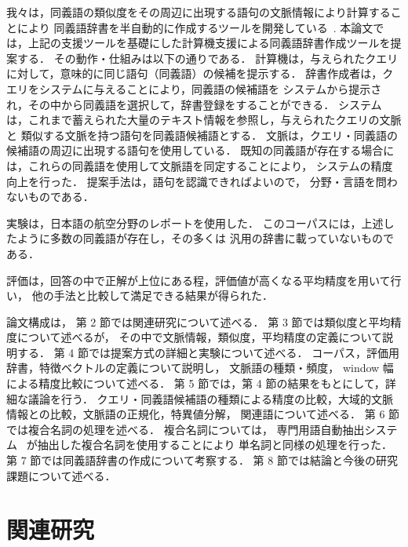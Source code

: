 \documentclass[japanese]{jnlp_1.4}
\begin{document}
我々は，同義語の類似度をその周辺に出現する語句の文脈情報により計算することにより
同義語辞書を半自動的に作成するツールを開発している~\cite{terada06,terada07}. 
本論文では，上記の支援ツールを基礎にした計算機支援による同義語辞書作成ツールを提案する．
その動作・仕組みは以下の通りである．
計算機は，与えられたクエリに対して，意味的に同じ語句（同義語）の候補を提示する．
辞書作成者は，クエリをシステムに与えることにより，同義語の候補語を
システムから提示され，その中から同義語を選択して，辞書登録をすることができる．
システムは，これまで蓄えられた大量のテキスト情報を参照し，与えられたクエリの文脈と
類似する文脈を持つ語句を同義語候補語とする．
文脈は，クエリ・同義語の候補語の周辺に出現する語句を使用している．
既知の同義語が存在する場合には，これらの同義語を使用して文脈語を同定することにより，
システムの精度向上を行った．
提案手法は，語句を認識できればよいので，
分野・言語を問わないものである．

実験は，日本語の航空分野のレポートを使用した．
このコーパスには，上述したように多数の同義語が存在し，その多くは
汎用の辞書に載っていないものである．

評価は，回答の中で正解が上位にある程，評価値が高くなる平均精度を用いて行い，
他の手法と比較して満足できる結果が得られた．

論文構成は，
第 2 節では関連研究について述べる．
第 3 節では類似度と平均精度について述べるが，
その中で文脈情報，類似度，平均精度の定義について説明する．
第 4 節では提案方式の詳細と実験について述べる．
コーパス，評価用辞書，特徴ベクトルの定義について説明し，
文脈語の種類・頻度，
window 幅による精度比較について述べる．
第 5 節では，第 4 節の結果をもとにして，詳細な議論を行う．
クエリ・同義語候補語の種類による精度の比較，大域的文脈情報との比較，文脈語の正規化，特異値分解，
関連語について述べる．
第 6 節では複合名詞の処理を述べる．
複合名詞については，
専門用語自動抽出システム~\cite{termextract} が抽出した複合名詞を使用することにより
単名詞と同様の処理を行った．
第 7 節では同義語辞書の作成について考察する．
第 8 節では結論と今後の研究課題について述べる．




\section{関連研究}
\label{sec:関連研究}
\end{document}
